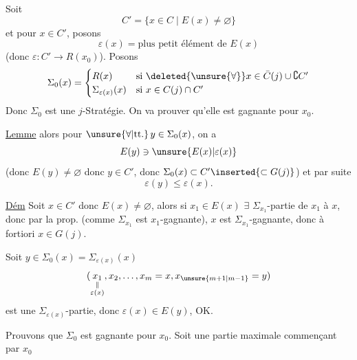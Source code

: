 Soit
\[
C'=\{x\in C\mid E(x)\ne\varnothing\}
\]
et pour $x\in C'$, posons
\[
\varepsilon(x)=\text{plus petit élément de }E(x)
\]
(donc $\varepsilon:C'\longrightarrow R(x_0)$). Posons
\[
\Sigma_0(x)=\begin{cases}
R(x)&\text{si }\deleted{\unsure{\forall}}x\in\bar C(j)\cup\complement C'\\
\Sigma_{\varepsilon(x)}(x)&\text{si }x\in C(j)\cap C'
\end{cases}
\]
Donc $\Sigma_0$ est une $j$-Stratégie. On va prouver qu'elle est gagnante pour $x_0$.

\uline{Lemme}\quad {}   alors  pour $\unsure{\forall|\text{tt.}}\,y\in\Sigma_0(x)$, on a
\[
E(y)\ni\unsure{E(x)|\varepsilon(x)}
\]
(donc $E(y)\ne\varnothing$ donc $y\in C'$, donc $\Sigma_0(x)\subset C'\inserted{\subset G(j)}$) et par suite
\[
\varepsilon(y)\leq\varepsilon(x).
\]

\uline{Dém}
Soit $x\in C'$ donc $E(x)\ne\varnothing$, alors si $x_1\in E(x)$ $\exists$  $\Sigma_{x_1}$-partie de $x_1$ à $x$, donc par la prop. (comme $\Sigma_{x_1}$ est $x_1$-gagnante), $x$ est $\Sigma_{x_1}$-gagnante, donc à fortiori $x\in G(j)$.

Soit $y\in\Sigma_0(x)=\Sigma_{\varepsilon(x)}(x)$
\[
(\underset{\substack{\Vert\\\varepsilon(x)}}{x_1},x_2,\ldots,x_m=x,x_{\unsure{m+1|m-1}}=y)
\]
est une $\Sigma_{\varepsilon(x)}$-partie, donc  $\varepsilon(x)\in E(y)$, OK.

Prouvons que $\Sigma_0$ est gagnante pour $x_0$.
Soit une partie maximale commençant par $x_0$
